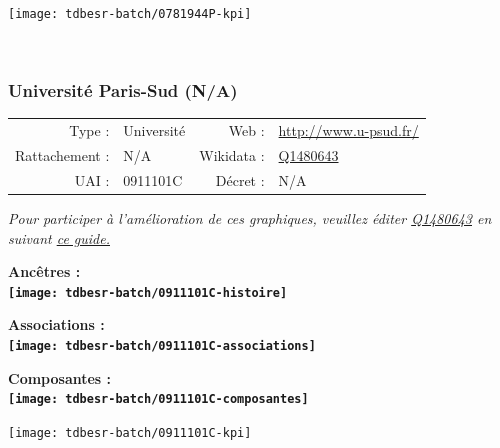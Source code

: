 \documentclass[12pt,french,]{article}
\begin{document}
\begin{center}\texttt{[image: tdbesr-batch/0781944P-kpi]} \end{center}\checkoddpage

\ifoddpage ~\newpage \fi   

\hypertarget{universituxe9-paris-sud-na}{%
\subsubsection{Université Paris-Sud
(N/A)}\label{universituxe9-paris-sud-na}}

\begin{tabular*}{\textwidth}{rp{5cm}rl}  
\hline  
Type : & Université & Web : &\href{http://www.u-psud.fr/}{http://www.u-psud.fr/} \\  
Rattachement : & N/A & Wikidata : & \href{https://www.wikidata.org/entity/Q1480643}{Q1480643} \\  
UAI : & 0911101C & Décret : & N/A \\  
\hline  
\end{tabular*}

\textit{\scriptsize Pour participer à l'amélioration de ces graphiques, veuillez éditer  \href{https://www.wikidata.org/entity/Q1480643}{Q1480643}  en suivant \href{https://github.com/cpesr/wikidataESR/blob/master/Rmd/wikidataESR.md}{ce guide.}}

\vspace{1cm}  
\begin{minipage}[b]{0.50\textwidth}\begin{center} \bf Ancêtres : \\  
\texttt{[image: tdbesr-batch/0911101C-histoire]} \end{center}\end{minipage}\begin{minipage}[b]{0.50\textwidth}\begin{center} \bf Associations : \\  
\texttt{[image: tdbesr-batch/0911101C-associations]} \end{center}\end{minipage}

\hrulefill

\begin{center} \bf Composantes : \\  
\texttt{[image: tdbesr-batch/0911101C-composantes]} \end{center}

\begin{center}\texttt{[image: tdbesr-batch/0911101C-kpi]} \end{center}\checkoddpage
\end{document}
